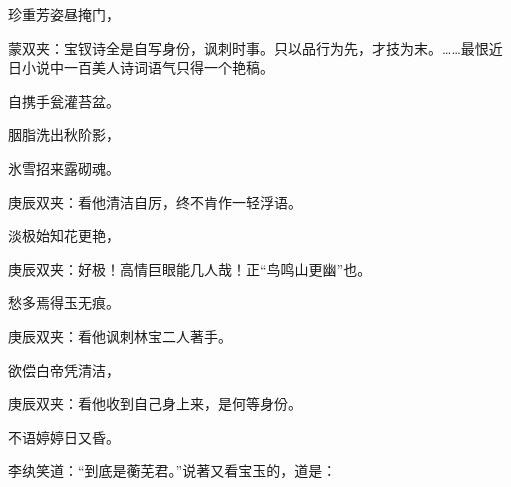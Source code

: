 \begin{poem}
    \begin{pl}珍重芳姿昼掩门，\end{pl}
    \begin{note}蒙双夹：宝钗诗全是自写身份，讽刺时事。只以品行为先，才技为末。……最恨近日小说中一百美人诗词语气只得一个艳稿。\end{note}

    \begin{pl}自携手瓮灌苔盆。\end{pl}

    \begin{pl}胭脂洗出秋阶影，\end{pl}

    \begin{pl}氷雪招来露砌魂。\end{pl}
    \begin{note}庚辰双夹：看他清洁自厉，终不肯作一轻浮语。\end{note}

    \begin{pl}淡极始知花更艳，\end{pl}
    \begin{note}庚辰双夹：好极！高情巨眼能几人哉！正“鸟鸣山更幽”也。\end{note}

    \begin{pl}愁多焉得玉无痕。\end{pl}
    \begin{note}庚辰双夹：看他讽刺林宝二人著手。\end{note}

    \begin{pl}欲偿白帝凭清洁，\end{pl}
    \begin{note}庚辰双夹：看他收到自己身上来，是何等身份。\end{note}

    \begin{pl}不语婷婷日又昏。\end{pl}
\end{poem}


\begin{parag}
    李纨笑道：“到底是蘅芜君。”说著又看宝玉的，道是：
\end{parag}


